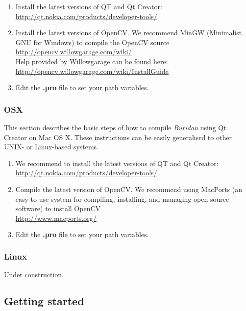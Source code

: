 \documentclass[11pt,a4paper]{article}
\begin{document}
\begin{enumerate}
\item Install the latest versions of QT and Qt Creator: \\ \url{http://qt.nokia.com/products/developer-tools/}
\item Install the latest versions of OpenCV. We recommend MinGW (Minimalist GNU for Windows) to compile the OpenCV source \\ \url{http://opencv.willowgarage.com/wiki/} \\
Help provided by Willowgarage can be found here: \\ 
\url{http://opencv.willowgarage.com/wiki/InstallGuide} 
\item Edit the {\bf .pro} file to set your path variables. 
\end{enumerate}

\subsubsection{OSX}

This section describes the basic steps of how to compile {\it Buridan} using Qt Creator on Mac OS X. These instructions can be easily generalised to other UNIX- or Linux-based systems. 

\begin{enumerate}
\item We recommend to install the latest versions of QT and Qt Creator: \\ \url{http://qt.nokia.com/products/developer-tools/}
\item Compile the latest version of OpenCV. We recommend using MacPorts (an easy to use system for compiling, installing, and managing open source software) to install OpenCV \\ \url{http://www.macports.org/}
\item Edit the {\bf .pro} file to set your path variables. 
\end{enumerate}

\subsubsection{Linux}

Under construction.  

\subsection{Getting started}
\end{document}
